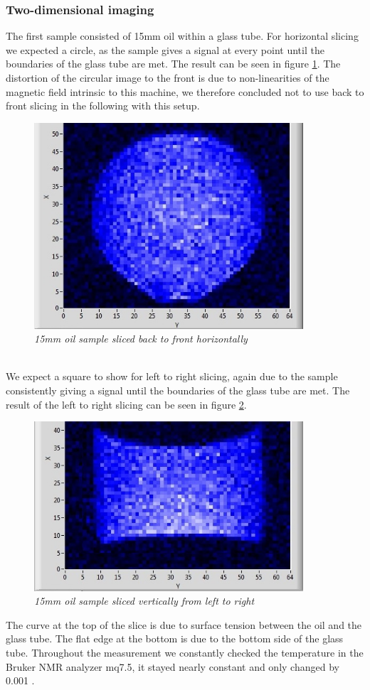 \subsubsection{Two-dimensional imaging}
The first sample consisted of 15mm oil within a glass tube. For horizontal slicing we expected a circle, as the sample gives a signal at every point until the boundaries of the glass tube are met. The result can be seen in figure \ref{fig:14}. The distortion of the circular image to the front is due to non-linearities of the magnetic field intrinsic to this machine, we therefore concluded not to use back to front slicing in the following with this setup.
\begin{figure}[h]
\includegraphics[width=100mm]{OilCircle}
\centering
\caption{\itshape 15mm oil sample sliced back to front horizontally}
\label{fig:14}
\end{figure}
\noindent
\\
We expect a square to show for left to right slicing, again due to the sample consistently giving a signal until the boundaries of the glass tube are met.
The result of the left to right slicing can be seen in figure \ref{fig:15}.
\begin{figure}[h]
	\includegraphics[width=100mm]{OilSlice}
	\centering
	\caption{\itshape 15mm oil sample sliced vertically from left to right }
	\label{fig:15}
\end{figure}  
\noindent
The curve at the top of the slice is due to surface tension  between the oil and the glass tube. The flat edge at the bottom is due to the bottom side of the glass tube.
Throughout the measurement we constantly checked the temperature in the Bruker NMR analyzer mq7.5, it stayed nearly constant and only changed by 0.001 \textcelsius.\\
\label{sec:4}

